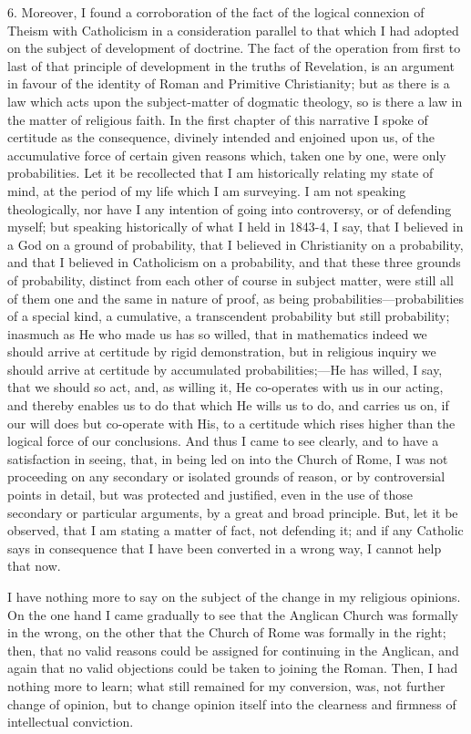 6. Moreover, I found a corroboration
of the fact of the logical connexion of Theism with Catholicism in a
consideration parallel to that which I had
adopted on the subject of development of doctrine. The fact of the
operation from first to last of that principle of development in the
truths of Revelation, is an argument in favour of the identity of
Roman and Primitive Christianity; but as there is a law which acts upon
the subject-matter of dogmatic theology, so is there a law in the matter
of religious faith. In the first chapter of this narrative I
spoke of certitude as the consequence, divinely intended and enjoined
upon us, of the accumulative force of certain given reasons which, taken
one by one, were only probabilities. Let it be recollected that I am
historically relating my state of mind, at the period of my life which I
am surveying. I am not speaking theologically, nor have I any
intention of going into controversy, or of defending myself; but
speaking historically of what I held in 1843-4, I say, that I believed
in a God on a ground of probability, that I believed in Christianity on
a probability, and that I believed in Catholicism on a probability, and
that these three grounds of probability, distinct from each
other of course in subject matter, were still all of them one and the
same in nature of proof, as being probabilities—probabilities of a
special kind, a cumulative, a transcendent probability but
still probability; inasmuch as He who made us has so willed, that in
mathematics indeed we should arrive at certitude by rigid
demonstration, but in religious inquiry we should arrive at
certitude by accumulated probabilities;—He has
willed, I say, that we should so act, and, as willing it,
He co-operates with us in our acting, and thereby enables us to
do that which He wills us to do, and carries us on, if our will
does but co-operate with His, to a certitude which rises
higher than the logical force of our conclusions. And thus I came to see
clearly, and to have a satisfaction in seeing, that, in being led on
into the Church of Rome, I was not proceeding on any
secondary or isolated grounds of reason, or by controversial
points in detail, but was protected and justified, even in the use of
those secondary or particular arguments, by a great and broad
principle. But, let it be observed, that I am stating a matter of fact,
not defending it; and if any Catholic says in consequence that I have
been converted in a wrong way, I cannot help that now.

I
have nothing more to say on the subject of the change in my religious
opinions. On the one hand I came gradually to see that the Anglican
Church was formally in the wrong, on the other that the Church of Rome
was formally in the right; then, that no valid reasons could be assigned
for continuing in the Anglican, and again that no valid objections could
be taken to joining the Roman. Then, I had nothing more to learn; what
still remained for my conversion, was, not further change of opinion,
but to change opinion itself into the clearness and firmness of
intellectual conviction.


